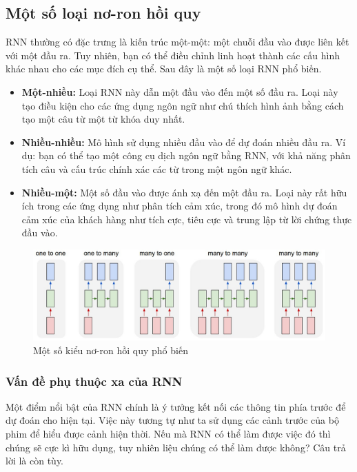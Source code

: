 \subsection{Một số loại nơ-ron hồi quy}
\indent RNN thường có đặc trưng là kiến trúc một-một: một chuỗi đầu vào được liên kết với một đầu ra. Tuy nhiên, bạn có thể điều chỉnh linh hoạt thành các cấu hình khác nhau cho các mục đích cụ thể. Sau đây là một số loại RNN phổ biến.
\begin{itemize}
    \item \textbf{Một-nhiều:} Loại RNN này dẫn một đầu vào đến một số đầu ra. Loại này tạo điều kiện cho các ứng dụng ngôn ngữ như chú thích hình ảnh bằng cách tạo một câu từ một từ khóa duy nhất.
    \item \textbf{Nhiều-nhiều:} Mô hình sử dụng nhiều đầu vào để dự đoán nhiều đầu ra. Ví dụ: bạn có thể tạo một công cụ dịch ngôn ngữ bằng RNN, với khả năng phân tích câu và cấu trúc chính xác các từ trong một ngôn ngữ khác.
    \item \textbf{Nhiều-một:} Một số đầu vào được ánh xạ đến một đầu ra. Loại này rất hữu ích trong các ứng dụng như phân tích cảm xúc, trong đó mô hình dự đoán cảm xúc của khách hàng như tích cực, tiêu cực và trung lập từ lời chứng thực đầu vào.
\end{itemize}

\begin{figure}[H]
    \centering
    \includegraphics[width=\textwidth,height=\textheight,keepaspectratio]{Images/Theoretical basis/RNN_Type.jpeg}
    \caption{Một số kiểu nơ-ron hồi quy phổ biến}
    \label{fig:enter-label}
\end{figure}
\subsubsection{Vấn đề phụ thuộc xa của RNN}

\indent Một điểm nổi bật của RNN chính là ý tưởng kết nối các thông tin phía trước để dự đoán cho hiện tại. Việc này tương tự như ta sử dụng các cảnh trước của bộ phim để hiểu được cảnh hiện thời. Nếu mà RNN có thể làm được việc đó thì chúng sẽ cực kì hữu dụng, tuy nhiên liệu chúng có thể làm được không? Câu trả lời là còn tùy.

